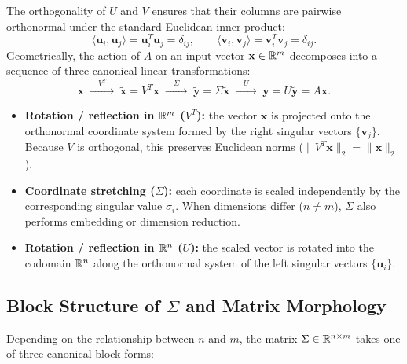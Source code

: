 The orthogonality of $U$ and $V$ ensures that their columns are pairwise orthonormal under the standard Euclidean inner product:
\begin{equation}
    \langle \mathbf{u}_i, \mathbf{u}_j \rangle = \mathbf{u}_i^T \mathbf{u}_j = \delta_{ij}, \qquad \langle \mathbf{v}_i, \mathbf{v}_j \rangle = \mathbf{v}_i^T \mathbf{v}_j = \delta_{ij}.
\end{equation}
Geometrically, the action of $A$ on an input vector $\mathbf{x} \in \mathbb{R}^m$ decomposes into a sequence of three canonical linear transformations:
\begin{equation}
    \mathbf{x} \;\xrightarrow{\quad V^T \quad}\; \tilde{\mathbf{x}} = V^T \mathbf{x} \;\xrightarrow{\quad \Sigma \quad}\; \tilde{\mathbf{y}} = \Sigma \tilde{\mathbf{x}} \;\xrightarrow{\quad U \quad}\; \mathbf{y} = U \tilde{\mathbf{y}} = A\mathbf{x}.
\end{equation}
\begin{itemize}
    \item \textbf{Rotation / reflection in $\mathbb{R}^m$ ($V^T$):} the vector $\mathbf{x}$ is projected onto the orthonormal coordinate system formed by the right singular vectors $\{\mathbf{v}_j\}$. Because $V$ is orthogonal, this preserves Euclidean norms ($\|V^T \mathbf{x}\|_2 = \|\mathbf{x}\|_2$).
    \item \textbf{Coordinate stretching ($\Sigma$):} each coordinate is scaled independently by the corresponding singular value $\sigma_i$. When dimensions differ ($n \neq m$), $\Sigma$ also performs embedding or dimension reduction.
    \item \textbf{Rotation / reflection in $\mathbb{R}^n$ ($U$):} the scaled vector is rotated into the codomain $\mathbb{R}^n$ along the orthonormal system of the left singular vectors $\{\mathbf{u}_i\}$.
\end{itemize}

\subsection{Block Structure of \texorpdfstring{$\Sigma$}{Sigma} and Matrix Morphology}

Depending on the relationship between $n$ and $m$, the matrix $\Sigma \in \mathbb{R}^{n \times m}$ takes one of three canonical block forms:

